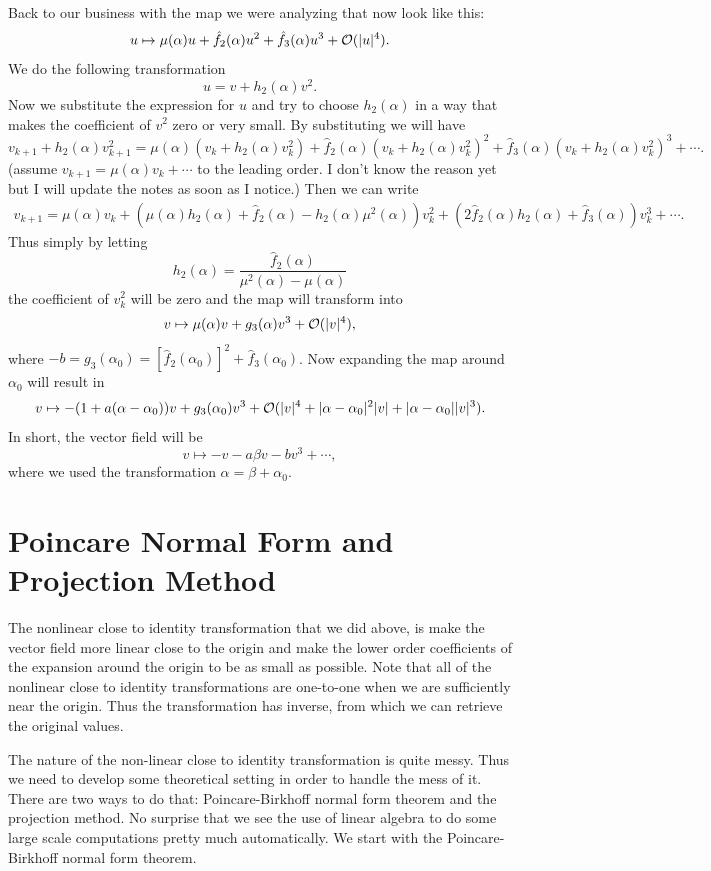 Back to our business with the map we were analyzing that now look like this:
\[ u \mapsto \mu(\alpha)u + \hat{f}_2(\alpha)u^2 + \hat{f}_3(\alpha)u^3 + \mathcal{O}(|u|^4). \]
We do the following transformation
\[ u = v + h_2(\alpha) v^2. \]
Now we substitute the expression for $u$ and try to choose $h_2(\alpha)$ in a way that makes the coefficient of $v^2$ zero or very small. By substituting we will have
\[ v_{k+1} + h_2(\alpha)v_{k+1}^2 = \mu(\alpha)(v_k+h_2(\alpha)v_k^2) + \hat{f}_2(\alpha)(v_k+h_2(\alpha)v_k^2)^2 + \hat{f}_3(\alpha)(v_k+h_2(\alpha)v_k^2)^3 + \cdots. \]
(assume $v_{k+1} = \mu(\alpha)v_k + \cdots$ to the leading order. I don't know the reason yet but I will update the notes as soon as I notice.) Then we can write
\begin{align*}
	 v_{k+1} = \mu(\alpha)v_k + (\mu(\alpha)h_2(\alpha) + \hat{f}_2(\alpha)-h_2(\alpha)\mu^2(\alpha))v_k^2 + (2\hat{f}_2(\alpha)h_2(\alpha)+\hat{f}_3(\alpha))v_k^3 + \cdots. 
\end{align*}
Thus simply by letting
\[ h_2(\alpha) = \frac{\hat{f}_2(\alpha)}{\mu^2(\alpha)-\mu(\alpha)} \]
the coefficient of $v_k^2$ will be zero and the map will transform into
\[ v \mapsto \mu(\alpha)v + g_3(\alpha)v^3 + \mathcal{O}(|v|^4), \]
where $-b = g_3(\alpha_0) = [\hat{f}_2(\alpha_0)]^2 + \hat{f}_3(\alpha_0)$. Now expanding the map around $\alpha_0$ will result in 
\[ v \mapsto -(1+a(\alpha-\alpha_0))v + g_3(\alpha_0)v^3 + \mathcal{O}(|v|^4 + |\alpha-\alpha_0|^2|v| + |\alpha-\alpha_0||v|^3).   \]
In short, the vector field will be
\[ v \mapsto -v - a\beta v - bv^3 + \cdots, \]
where we used the transformation $\alpha = \beta + \alpha_0$.


\section{Poincare Normal Form and Projection Method}
The nonlinear close to identity transformation that we did above, is make the vector field more linear close to the origin and make the lower order coefficients of the expansion around the origin to be as small as possible. Note that all of the nonlinear close to identity transformations are one-to-one when we are sufficiently near the origin. Thus the transformation has inverse, from which we can retrieve the original values.

The nature of the non-linear close to identity transformation is quite messy. Thus we need to develop some theoretical setting in order to handle the mess of it. There are two ways to do that: Poincare-Birkhoff normal form theorem and the projection method. No surprise that we see the use of linear algebra to do some large scale computations pretty much automatically. We start with the Poincare-Birkhoff normal form theorem.


